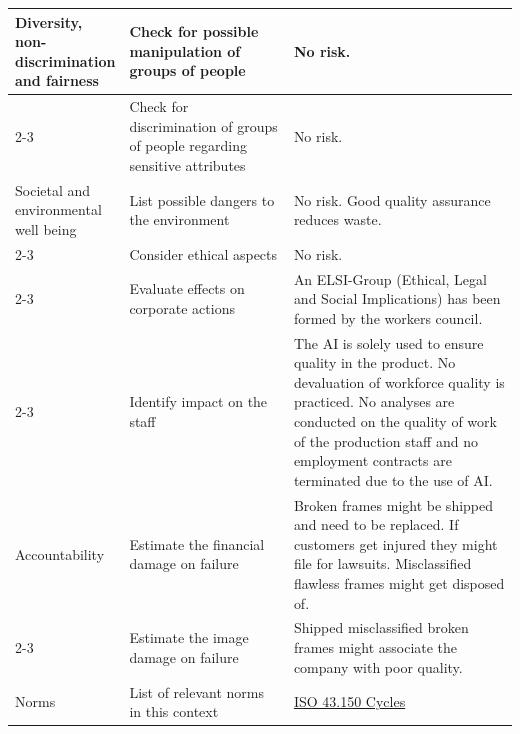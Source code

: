 {\begin{longtable}{p{0.15\linewidth}|p{0.35\linewidth}p{0.5\linewidth}}
    \hline
    Diversity, non-discrimination and fairness 
        & Check for possible manipulation of groups of people & No risk.  \\\cline{2-3}
        & Check for discrimination of groups of people regarding sensitive attributes  & No risk. \\
        
    \hline
    \pagebreak
    \hline
    Societal and environmental well being 
        & List possible dangers to the environment & No risk. Good quality assurance reduces waste.\\\cline{2-3}
        & Consider ethical aspects & No risk. \\\cline{2-3}  
        & Evaluate effects on corporate actions & An ELSI-Group (Ethical, Legal and Social Implications) has been formed by the workers council. \\\cline{2-3}  
        & Identify impact on the staff & The AI is solely used to ensure quality in the product. No devaluation of workforce quality is practiced. No analyses are conducted on the quality of work of the production staff and no employment contracts are terminated due to the use of AI. \\    
        
    \hline
    Accountability                      
        & Estimate the financial damage on failure & Broken frames might be shipped and need to be replaced. If customers get injured they might file for                             lawsuits. Misclassified flawless frames might get disposed of. \\\cline{2-3}  
        & Estimate the image damage on failure & Shipped misclassified broken frames might associate the company with poor quality. \\
        
    \hline
    Norms               
        & List of relevant norms in this context & \href{https://www.iso.org/ics/43.150/x/}{ISO 43.150 Cycles} \\
    \bottomrule
  \end{longtable}
}



